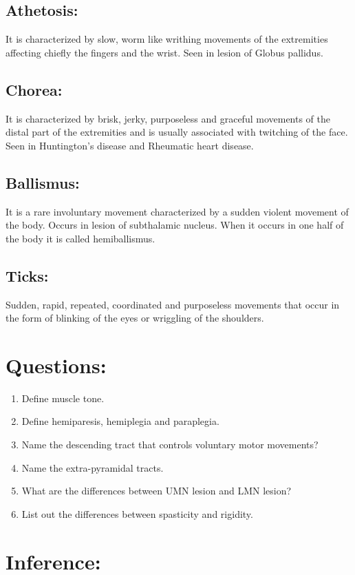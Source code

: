 \documentclass[a4paper,12pt]{book}
\begin{document}
	\subsection*{Athetosis:}
		It is characterized by slow, worm like writhing movements of the extremities affecting chiefly the fingers and the wrist. Seen in lesion of Globus pallidus.
		\subsection*{Chorea:}
			It is characterized by brisk, jerky, purposeless and graceful movements of the distal part of the extremities and is usually associated with twitching of the face. Seen in Huntington's disease and Rheumatic heart disease.
			\subsection*{Ballismus:}
				It is a rare involuntary movement characterized by a sudden violent movement of the body. Occurs in lesion of subthalamic nucleus. When it occurs in one half of the body it is called hemiballismus.
				\subsection*{Ticks:}
				Sudden, rapid, repeated, coordinated and purposeless movements that occur in the form of blinking of the eyes or wriggling of the shoulders.
				\section*{Questions:}
				\begin{enumerate}
\item{Define muscle tone.}
\item{Define hemiparesis, hemiplegia and paraplegia.}
\item{Name the descending tract that controls voluntary motor movements?}
\item{Name the extra-pyramidal tracts.}
\item{What are the differences between UMN lesion and LMN lesion?}
\item{List out the differences between spasticity and rigidity.}
				\end{enumerate}
\section*{Inference:}
\vspace{2in}
\end{document}
